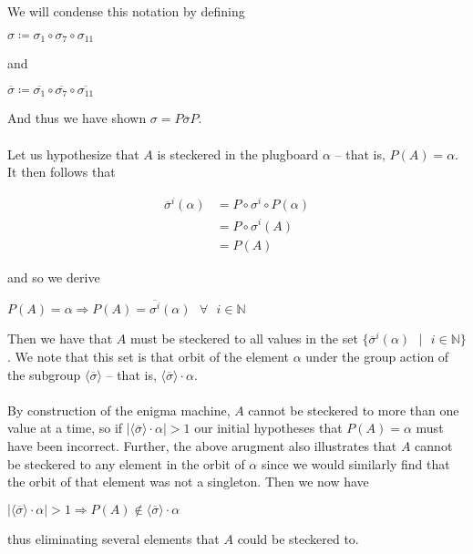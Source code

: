     We will condense this notation by defining
    \begin{center}
        $\sigma \coloneq \sigma_{1}\circ\sigma_7\circ\sigma_{11}$
    \end{center}
    and 
    \begin{center}
        $\overline{\sigma} \coloneq \overline{\sigma_{1}}\circ\overline{\sigma_7}\circ\overline{\sigma_{11}}$
    \end{center}
    And thus we have shown $\sigma = P\overline{\sigma}P$.
    \\\\Let us hypothesize that $A$ is steckered in the plugboard $\alpha$ -- that is, $P(A) = \alpha$. It then follows that 
    \begin{center}
        \begin{align*}
            \overline{\sigma}^i(\alpha) &= P\circ\sigma^i\circ P(\alpha)
            \\&= P\circ\sigma^i(A)
            \\&= P(A)
        \end{align*}
    \end{center} 
    and so we derive 
    \begin{center}
        $P(A) = \alpha \Rightarrow P(A) = \overline{\sigma^i}(\alpha)\text{ }\forall\text{ }i\in\mathbb{N}$
    \end{center}
    Then we have that $A$ must be steckered to all values in the set $\{\overline{\sigma}^i(\alpha)\text{ }\vert\text{ }i\in\mathbb{N}\}$. 
    We note that this set is that orbit of the element $\alpha$ under the group action of the subgroup $\langle\overline{\sigma}\rangle$ -- that is, 
    $\langle\overline{\sigma}\rangle\cdot\alpha$. 
    \\\\By construction of the enigma machine, $A$ cannot be steckered to more than one value at a time, so if $|\langle\overline{\sigma}\rangle\cdot\alpha| > 1$ our initial
    hypotheses that $P(A) = \alpha$ must have been incorrect. Further, the above arugment also illustrates that $A$ cannot be steckered to any element in the orbit of $\alpha$ since 
    we would similarly find that the orbit of that element was not a singleton. Then we now have 
    \begin{center}
        $|\langle\overline{\sigma}\rangle\cdot\alpha| > 1 \Rightarrow P(A) \notin \langle\overline{\sigma}\rangle\cdot\alpha$
    \end{center} 
    thus eliminating several elements that $A$ could be steckered to. 
